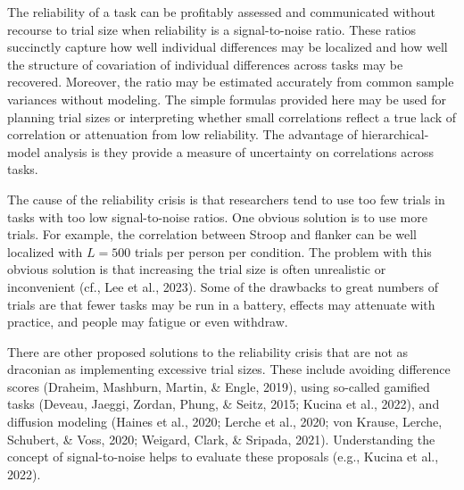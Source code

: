 \documentclass[
  ,man]{apa6}
\begin{document}
The reliability of a task can be profitably assessed and communicated without recourse to trial size when reliability is a signal-to-noise ratio. These ratios succinctly capture how well individual differences may be localized and how well the structure of covariation of individual differences across tasks may be recovered. Moreover, the ratio may be estimated accurately from common sample variances without modeling. The simple formulas provided here may be used for planning trial sizes or interpreting whether small correlations reflect a true lack of correlation or attenuation from low reliability. The advantage of hierarchical-model analysis is they provide a measure of uncertainty on correlations across tasks.

The cause of the reliability crisis is that researchers tend to use too few trials in tasks with too low signal-to-noise ratios. One obvious solution is to use more trials. For example, the correlation between Stroop and flanker can be well localized with \(L=500\) trials per person per condition. The problem with this obvious solution is that increasing the trial size is often unrealistic or inconvenient (cf., Lee et al., 2023). Some of the drawbacks to great numbers of trials are that fewer tasks may be run in a battery, effects may attenuate with practice, and people may fatigue or even withdraw.

There are other proposed solutions to the reliability crisis that are not as draconian as implementing excessive trial sizes. These include avoiding difference scores (Draheim, Mashburn, Martin, \& Engle, 2019), using so-called gamified tasks (Deveau, Jaeggi, Zordan, Phung, \& Seitz, 2015; Kucina et al., 2022), and diffusion modeling (Haines et al., 2020; Lerche et al., 2020; von Krause, Lerche, Schubert, \& Voss, 2020; Weigard, Clark, \& Sripada, 2021). Understanding the concept of signal-to-noise helps to evaluate these proposals (e.g., Kucina et al., 2022).
\end{document}
